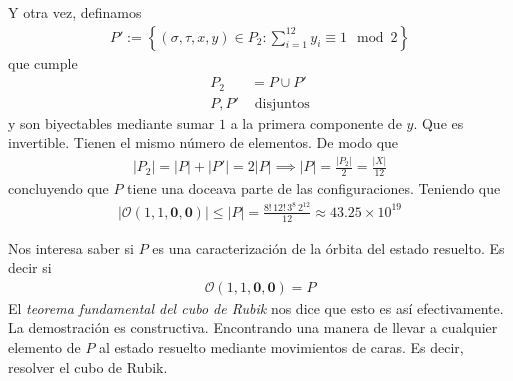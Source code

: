 \documentclass{article}
\theoremstyle{definition}
\begin{document}
Y otra vez, definamos
\begin{align*}
    P':=\left\{(\sigma,\tau,x,y)\in P_2:
    \sum_{i=1}^{12}y_i\equiv 1\mod 2\right\}
\end{align*}
que cumple
\begin{align*}
    P_2  & =P\cup P'         \\
    P,P' & \text{ disjuntos}
\end{align*}
y son biyectables mediante sumar $1$ a la primera componente de $y$. Que es invertible. Tienen el mismo número de elementos. De modo que
\begin{align*}
    |P_2|=|P|+|P'|=2|P|\implies |P|=\frac{|P_2|}{2}=\frac{|X|}{12}
\end{align*}
concluyendo que $P$ tiene una doceava parte de las configuraciones. Teniendo que
\begin{align*}
    |\mathcal{O}(1,1,\mathbf{0},\mathbf{0})|\leq |P|=\frac{8!\,12!\,3^{8}\,2^{12}}{12}\approx 43.25\times10^{19}
\end{align*}

Nos interesa saber si $P$ es una caracterización de la órbita del estado resuelto. Es decir si
\begin{align*}
    \mathcal{O}(1,1,\mathbf{0},\mathbf{0})=P
\end{align*}
El \textit{teorema fundamental del cubo de Rubik} nos dice que esto es así efectivamente. La demostración es constructiva. Encontrando una manera de llevar a cualquier elemento de $P$ al estado resuelto mediante movimientos de caras. Es decir, resolver el cubo de Rubik.
\end{document}
